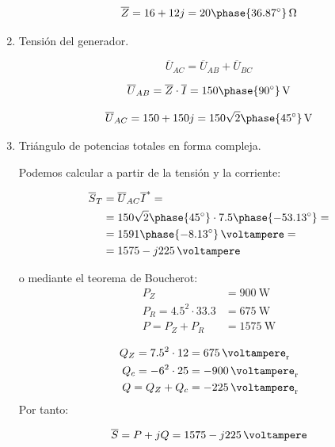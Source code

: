 \begin{enumerate}
  \[
    \overline{Z} = 16 + 12j  = \qty[parse-numbers=false]{20\phase{\ang{36.87}}}{\ohm}
  \]

  
\item Tensión del generador.

  \[
    \overline{U}_{AC} = \overline{U}_{AB} + \overline{U}_{BC}
  \]

  \[
    \overline{U}_{AB} = \overline{Z} \cdot \overline{I} = \qty[parse-numbers=false]{150\phase{\ang{90}}}{\volt}
  \]

  \[
    \overline{U}_{AC} = 150 + 150j = \qty[parse-numbers=false]{150\sqrt{2}\phase{\ang{45}}}{\volt}
  \]

\item Triángulo de potencias totales en forma compleja.

  Podemos calcular a partir de la tensión y la corriente:


  \begin{align*}
    \overline{S}_T &= \overline{U}_{AC} \overline{I}^* =\\
                   &= 150\sqrt{2}\phase{\ang{45}} \cdot 7.5\phase{\ang{-53.13}} =\\
                   &= \qty[parse-numbers=false]{1591\phase{\ang{-8.13}}}{\voltampere}=\\
                   &= \qty[parse-numbers=false]{1575 - j225}{\voltampere}
  \end{align*}
  
  o mediante el teorema de Boucherot:
  \begin{align*}
    P_Z &= \qty{900}{\watt}\\
    P_R = 4.5^2 \cdot 33.3 &= \qty{675}{\watt}\\
    P = P_Z + P_R &= \qty{1575}{\watt}
  \end{align*}

  \begin{align*}
    Q_Z = 7.5^2 \cdot 12 &= \qty{675}{\voltampere_r}\\
    Q_c = - 6^2 \cdot 25 &= \qty{-900}{\voltampere_r}\\
    Q = Q_Z + Q_c &= \qty{-225}{\voltampere_r}
  \end{align*}
  Por tanto:

  \[
    \overline{S} = P + jQ = \qty[parse-numbers=false]{1575 - j225}{\voltampere}
  \]
  
\end{enumerate}



